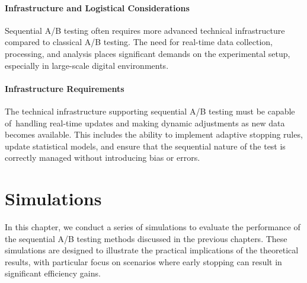 \documentclass[magisterska, english]{pwr_wmat_praca_dyplomowa}
\theoremstyle{plain}
\numberwithin{theorem}{chapter}
\theoremstyle{definition}
\numberwithin{theorem}{chapter}
\begin{document}
\subsubsection{Infrastructure and Logistical Considerations}
Sequential A/B testing often requires more advanced technical infrastructure compared to classical A/B testing. The need for real-time data collection, processing, and analysis places significant demands on the experimental setup, especially in large-scale digital environments.

\subsubsection{Infrastructure Requirements}
The technical infrastructure supporting sequential A/B testing must be capable of~handling real-time updates and making dynamic adjustments as new data becomes available. This includes the ability to implement adaptive stopping rules, update statistical models, and ensure that the sequential nature of the test is correctly managed without introducing bias or errors.


\chapter{Simulations}\label{ch:Simulations}
In this chapter, we conduct a series of simulations to evaluate the performance of the sequential A/B testing methods discussed in the previous chapters. These simulations are designed to illustrate the practical implications of the theoretical results, with particular focus on scenarios where early stopping can result in significant efficiency gains.
\end{document}
